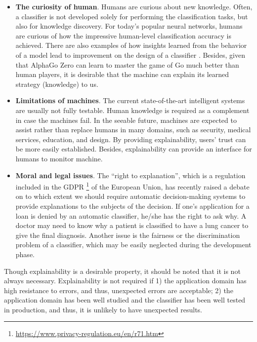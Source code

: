 \begin{itemize}
  \item \textbf{The curiosity of human}. Humans are curious about new knowledge. %
  Often, a classifier is not developed solely for performing the classification tasks, but also for knowledge discovery. For today's popular neural networks, humans are curious of how the impressive human-level classification accuracy is achieved. There are also examples of how insights learned from the behavior of a model lead to improvement on the design of a classifier \cite{zeiler2014eccv, alsallakh2017cnn-hierarchy}. Besides, given that AlphaGo Zero \cite{silver2017mastering} can learn to master the game of Go much better than human players, it is desirable that the machine can explain its learned strategy (knowledge) to us.
  \item \textbf{Limitations of machines}. The current state-of-the-art intelligent systems are usually not fully testable. Human knowledge is required as a complement in case the machines fail. In the seeable future, machines are expected to assist rather than replace humans in many domains, such as security, medical services, education, and design. By providing explainability, users' trust can be more easily established. Besides, explainability can provide an interface for humans to monitor machine.
  \item \textbf{Moral and legal issues}. The ``right to explanation'', which is a regulation included in the GDPR \footnote{\url{https://www.privacy-regulation.eu/en/r71.htm}} of the European Union, has recently raised a debate on to which extent we should require automatic decision-making systems to provide explanations to the subjects of the decision. If one's application for a loan is denied by an automatic classifier, he/she has the right to ask why. A doctor may need to know why a patient is classified to have a lung cancer to give the final diagnosis. Another issue is the fairness or the discrimination problem of a classifier, which may be easily neglected during the development phase.
\end{itemize}

Though explainability is a desirable property, it should be noted that it is not always necessary. Explainability is not required if 1) the application domain has high resistance to errors, and thus, unexpected errors are acceptable; 2) the application domain has been well studied and the classifier has been well tested in production, and thus, it is unlikely to have unexpected results.

\newpage